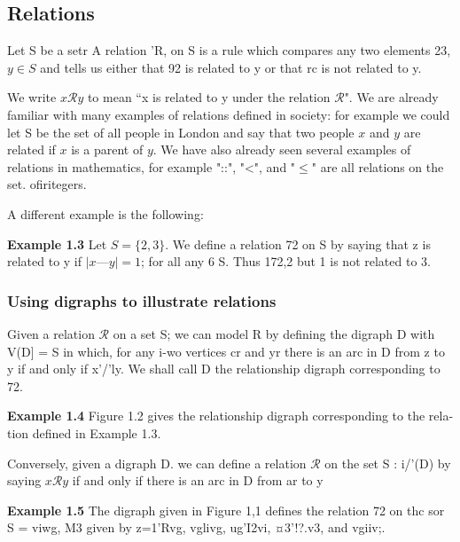 



\subsection*{Relations}
Let S be a setr A relation ’R, on S is a rule which compares any two elements
23, $y \in S$ and tells us either that 92 is related to y or that rc is not related to y. 

We write $x\mathcal{R}y$ to mean “x is related to y under the relation $\mathcal{R}$". We are already familiar with many examples of relations defined in society: for example we could let S be
the set of all people in London and say that two people $x$ and $y$ are related if $x$ is a
parent of $y$. We have also already seen several examples of relations in mathematics,
for example "::", "<", and "$\leq$" are all relations on the set. ofiritegers.

A different example is the following:

%


\textbf{Example 1.3} Let $S = \{2,3\}$. We define a relation 72 on S by saying that z is
related to y if $|x — y| = 1$; for all any 6 S. Thus 172,2 but 1 is not related to 3.

\subsubsection*{Using digraphs to illustrate relations}
Given a relation $\mathcal{R}$ on a set S; we can model R by defining the digraph D with
V(D] = S in which, for any i-wo vertices cr and yr there is an arc in D from z to y if
and only if x'/'ly. We shall call D the relationship digraph corresponding to 72.


\textbf{Example 1.4} Figure 1.2 gives the relationship digraph corresponding to the rela-
tion defined in Example 1.3.

Conversely, given a digraph D. we can define a relation $\mathcal{R}$ on the set S : i/'(D)
by saying $x\mathcal{R}y$ if and only if there is an arc in D from ar to y


\textbf{Example 1.5} The digraph given in Figure 1,1 defines the relation 72 on thc sor
S = {viwg, M3} given by z=1’Rvg, vglivg, ug’I2vi, ¤3’!?.v3, and vgiiv;.

